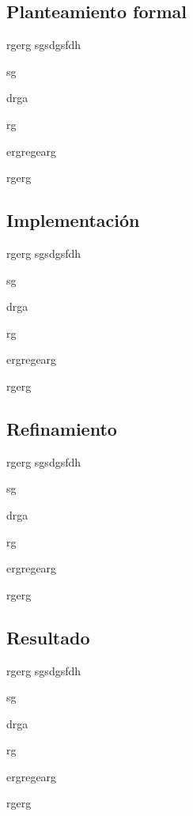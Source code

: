 \subsection{Planteamiento formal}

rgerg
sgsdgsfdh

sg

drga

rg

ergregearg

rgerg

\subsection{Implementación}

rgerg
sgsdgsfdh

sg

drga

rg

ergregearg

rgerg

\subsection{Refinamiento}

rgerg
sgsdgsfdh

sg

drga

rg

ergregearg

rgerg

\subsection{Resultado}

rgerg
sgsdgsfdh

sg

drga

rg

ergregearg

rgerg

